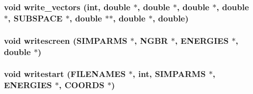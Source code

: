 \subsubsection{\setlength{\rightskip}{0pt plus 5cm}void write\_\-vectors (int, double $\ast$, double $\ast$, double $\ast$, double $\ast$, {\bf SUBSPACE} $\ast$, double $\ast$$\ast$, double $\ast$, double)}\label{proto__output_8h_029a09e090b5165a13e647e85d31b7e1}


\subsubsection{\setlength{\rightskip}{0pt plus 5cm}void writescreen ({\bf SIMPARMS} $\ast$, {\bf NGBR} $\ast$, {\bf ENERGIES} $\ast$, double $\ast$)}\label{proto__output_8h_9fcc72a0f8413ffe00a7bc59ac753339}


\subsubsection{\setlength{\rightskip}{0pt plus 5cm}void writestart ({\bf FILENAMES} $\ast$, int, {\bf SIMPARMS} $\ast$, {\bf ENERGIES} $\ast$, {\bf COORDS} $\ast$)}\label{proto__output_8h_feb877f7613157eb3c6922b2ee5f3413}


